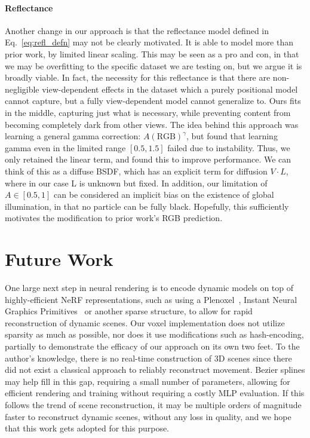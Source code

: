 \paragraph{Reflectance}\label{sec:refl_disc} Another change in our approach is that the reflectance model defined in Eq.~\ref{eq:refl_defn} may not be clearly motivated. It is able to model more than prior work, by limited linear scaling. This may be seen as a pro and con, in that we may be overfitting to the specific dataset we are testing on, but we argue it is broadly viable. In fact, the necessity for this reflectance is that there are non-negligible view-dependent effects in the dataset which a purely positional model cannot capture, but a fully view-dependent model cannot generalize to. Ours fits in the middle, capturing just what is necessary, while preventing content from becoming completely dark from other views. The idea behind this approach was learning a general gamma correction: $A (\text{RGB})^\gamma$, but found that learning gamma even in the limited range $[0.5,1.5]$ failed due to instability. Thus, we only retained the linear term, and found this to improve performance. We can think of this as a diffuse BSDF, which has an explicit term for diffusion $V\cdot L$, where in our case L is unknown but fixed. In addition, our limitation of $A\in[0.5,1]$ can be considered an implicit bias on the existence of global illumination, in that no particle can be fully black. Hopefully, this sufficiently motivates the modification to prior work's RGB prediction.

\section*{Future Work}

One large next step in neural rendering is to encode dynamic models on top of highly-efficient NeRF representations, such as using a Plenoxel~\cite{yu2021plenoxels}, Instant Neural Graphics Primitives~\cite{mueller2022instant} or another sparse structure, to allow for rapid reconstruction of dynamic scenes. Our voxel implementation does not utilize sparsity as much as possible, nor does it use modifications such as hash-encoding, partially to demonstrate the efficacy of our approach on its own two feet. To the author's knowledge, there is no real-time construction of 3D scenes since there did not exist a classical approach to reliably reconstruct movement. Bezier splines may help fill in this gap, requiring a small number of parameters, allowing for efficient rendering and training without requiring a costly MLP evaluation. If this follows the trend of scene reconstruction, it may be multiple orders of magnitude faster to reconstruct dynamic scenes, without any loss in quality, and we hope that this work gets adopted for this purpose.

